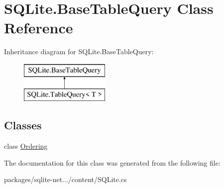 \hypertarget{classSQLite_1_1BaseTableQuery}{}\section{S\+Q\+Lite.\+Base\+Table\+Query Class Reference}
\label{classSQLite_1_1BaseTableQuery}
Inheritance diagram for S\+Q\+Lite.\+Base\+Table\+Query\+:\begin{figure}[H]
\begin{center}
\leavevmode
\includegraphics[height=2.000000cm]{classSQLite_1_1BaseTableQuery}
\end{center}
\end{figure}
\subsection*{Classes}
\begin{DoxyCompactItemize}
\item 
class \hyperlink{classSQLite_1_1BaseTableQuery_1_1Ordering}{Ordering}
\end{DoxyCompactItemize}


The documentation for this class was generated from the following file\+:\begin{DoxyCompactItemize}
\item 
packages/sqlite-\/net.../content/S\+Q\+Lite.\+cs\end{DoxyCompactItemize}
